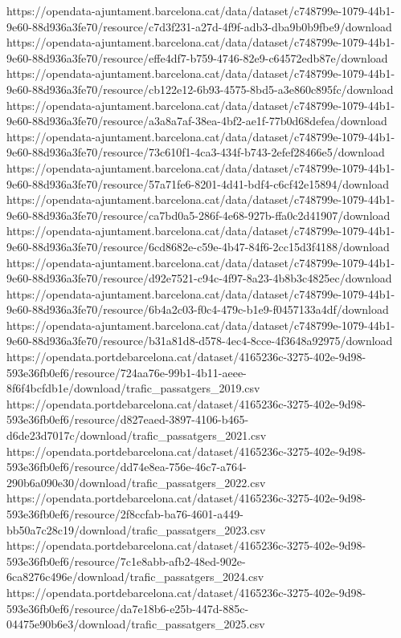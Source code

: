 https://opendata-ajuntament.barcelona.cat/data/dataset/c748799e-1079-44b1-9e60-88d936a3fe70/resource/c7d3f231-a27d-4f9f-adb3-dba9b0b9fbe9/download
https://opendata-ajuntament.barcelona.cat/data/dataset/c748799e-1079-44b1-9e60-88d936a3fe70/resource/effe4df7-b759-4746-82e9-c64572edb87e/download
https://opendata-ajuntament.barcelona.cat/data/dataset/c748799e-1079-44b1-9e60-88d936a3fe70/resource/cb122e12-6b93-4575-8bd5-a3e860c895fc/download
https://opendata-ajuntament.barcelona.cat/data/dataset/c748799e-1079-44b1-9e60-88d936a3fe70/resource/a3a8a7af-38ea-4bf2-ae1f-77b0d68defea/download
https://opendata-ajuntament.barcelona.cat/data/dataset/c748799e-1079-44b1-9e60-88d936a3fe70/resource/73c610f1-4ca3-434f-b743-2efef28466e5/download
https://opendata-ajuntament.barcelona.cat/data/dataset/c748799e-1079-44b1-9e60-88d936a3fe70/resource/57a71fe6-8201-4d41-bdf4-c6cf42e15894/download
https://opendata-ajuntament.barcelona.cat/data/dataset/c748799e-1079-44b1-9e60-88d936a3fe70/resource/ca7bd0a5-286f-4e68-927b-ffa0c2d41907/download
https://opendata-ajuntament.barcelona.cat/data/dataset/c748799e-1079-44b1-9e60-88d936a3fe70/resource/6cd8682e-c59e-4b47-84f6-2cc15d3f4188/download
https://opendata-ajuntament.barcelona.cat/data/dataset/c748799e-1079-44b1-9e60-88d936a3fe70/resource/d92e7521-c94c-4f97-8a23-4b8b3c4825ec/download
https://opendata-ajuntament.barcelona.cat/data/dataset/c748799e-1079-44b1-9e60-88d936a3fe70/resource/6b4a2c03-f0c4-479c-b1e9-f0457133a4df/download
https://opendata-ajuntament.barcelona.cat/data/dataset/c748799e-1079-44b1-9e60-88d936a3fe70/resource/b31a81d8-d578-4ec4-8cce-4f3648a92975/download
https://opendata.portdebarcelona.cat/dataset/4165236c-3275-402e-9d98-593e36fb0ef6/resource/724aa76e-99b1-4b11-aeee-8f6f4bcfdb1e/download/trafic_passatgers_2019.csv
https://opendata.portdebarcelona.cat/dataset/4165236c-3275-402e-9d98-593e36fb0ef6/resource/d827eaed-3897-4106-b465-d6de23d7017c/download/trafic_passatgers_2021.csv
https://opendata.portdebarcelona.cat/dataset/4165236c-3275-402e-9d98-593e36fb0ef6/resource/dd74e8ea-756e-46c7-a764-290b6a090e30/download/trafic_passatgers_2022.csv
https://opendata.portdebarcelona.cat/dataset/4165236c-3275-402e-9d98-593e36fb0ef6/resource/2f8ccfab-ba76-4601-a449-bb50a7c28c19/download/trafic_passatgers_2023.csv
https://opendata.portdebarcelona.cat/dataset/4165236c-3275-402e-9d98-593e36fb0ef6/resource/7c1e8abb-afb2-48ed-902e-6ca8276c496e/download/trafic_passatgers_2024.csv
https://opendata.portdebarcelona.cat/dataset/4165236c-3275-402e-9d98-593e36fb0ef6/resource/da7e18b6-e25b-447d-885c-04475e90b6e3/download/trafic_passatgers_2025.csv
